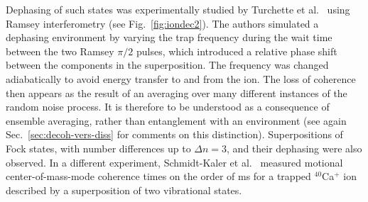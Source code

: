 \documentclass[3p,sort&compress,12pt]{elsarticle}
\begin{document}
Dephasing of such states was experimentally studied by Turchette et al.\ \cite{Turchette:2000:aa} using Ramsey interferometry  (see Fig.~\ref{fig:iondec2}). The authors simulated a dephasing environment by varying the trap frequency during the wait time between the two Ramsey $\pi/2$ pulses, which introduced a relative phase shift between the components in the superposition. The frequency was changed adiabatically to avoid energy transfer to and from the ion. The loss of coherence then appears as the result of an averaging over many different instances of the random noise process. It is therefore to be understood as a consequence of ensemble averaging, rather than entanglement with an environment (see again Sec.~\ref{sec:decoh-vers-diss} for comments on this distinction). Superpositions of Fock states, with number differences up to $\Delta n = 3$, and their dephasing were also observed. In a different experiment, Schmidt-Kaler et al.\ \cite{SchmidtKaler:2003:pp} measured motional center-of-mass-mode coherence times on the order of \unit[100]{ms} for a trapped $^{40}$Ca$^+$ ion described by a superposition of two vibrational states.
\end{document}
